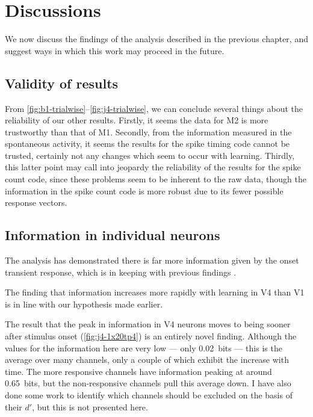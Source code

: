 \section{Discussions}

We now discuss the findings of the analysis described in the previous chapter, and suggest ways in which this work may proceed in the future.

\subsection{Validity of results}

From \autoref{fig:b1-trialwise}--\ref{fig:j4-trialwise}, we can conclude several things about the reliability of our other results.
Firstly, it seems the data for \ac{M2} is more trustworthy than that of \ac{M1}.
Secondly, from the information measured in the spontaneous activity, it seems the results for the spike timing code cannot be trusted, certainly not any changes which seem to occur with learning.
Thirdly, this latter point may call into jeopardy the reliability of the results for the spike count code, since these problems seem to be inherent to the raw data, though the information in the spike count code is more robust due to its fewer possible response vectors.

\subsection{Information in individual neurons}

The analysis has demonstrated there is far more information given by the onset transient response, which is in keeping with previous findings \citep{Muller2001}.

The finding that information increases more rapidly with learning in \ac{V4} than \ac{V1} is in line with our hypothesis made earlier.

The result that the peak in information in \ac{V4} neurons moves to being sooner after stimulus onset (\autoref{fig:j4-1x20tp4}) is an entirely novel finding.
Although the values for the information here are very low --- only \SI{0.02}{bits} --- this is the average over many channels, only a couple of which exhibit the increase with time.
The more responsive channels have information peaking at around \SI{0.65}{bits}, but the non-responsive channels pull this average down.
I have also done some work to identify which channels should be excluded on the basis of their $d'$, but this is not presented here.


